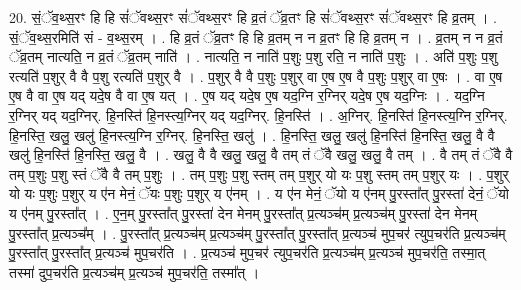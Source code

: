 \documentclass[17pt]{extarticle}
\begin{document}
20. सं॒ॅव॒थ्स॒रꣳ हि हि सं॑ॅवथ्स॒रꣳ सं॑ॅवथ्स॒रꣳ हि व्र॒तं ॅव्र॒तꣳ हि सं॑ॅवथ्स॒रꣳ सं॑ॅवथ्स॒रꣳ हि व्र॒तम् । . सं॒ॅव॒थ्स॒रमिति॑ सं - व॒थ्स॒रम् । . हि व्र॒तं ॅव्र॒तꣳ हि हि व्र॒तम् न न व्र॒तꣳ हि हि व्र॒तम् न । . व्र॒तम् न न व्र॒तं ॅव्र॒तम् नात्यति॒ न व्र॒तं ॅव्र॒तम् नाति॑ । . नात्यति॒ न नाति॑ प॒शुः प॒शु रति॒ न नाति॑ प॒शुः । . अति॑ प॒शुः प॒शु रत्यति॑ प॒शुर् वै वै प॒शु रत्यति॑ प॒शुर् वै । . प॒शुर् वै वै प॒शुः प॒शुर् वा ए॒ष ए॒ष वै प॒शुः प॒शुर् वा ए॒षः । . वा ए॒ष ए॒ष वै वा ए॒ष यद् यदे॒ष वै वा ए॒ष यत् । . ए॒ष यद् यदे॒ष ए॒ष यद॒ग्नि र॒ग्निर् यदे॒ष ए॒ष यद॒ग्निः । . यद॒ग्नि र॒ग्निर् यद् यद॒ग्निर्. हि॒नस्ति॑ हि॒नस्त्य॒ग्निर् यद् यद॒ग्निर्. हि॒नस्ति॑ । . अ॒ग्निर्. हि॒नस्ति॑ हि॒नस्त्य॒ग्नि र॒ग्निर्. हि॒नस्ति॒ खलु॒ खलु॑ हि॒नस्त्य॒ग्नि र॒ग्निर्. हि॒नस्ति॒ खलु॑ । . हि॒नस्ति॒ खलु॒ खलु॑ हि॒नस्ति॑ हि॒नस्ति॒ खलु॒ वै वै खलु॑ हि॒नस्ति॑ हि॒नस्ति॒ खलु॒ वै । . खलु॒ वै वै खलु॒ खलु॒ वै तम् तं ॅवै खलु॒ खलु॒ वै तम् । . वै तम् तं ॅवै वै तम् प॒शुः प॒शु स्तं ॅवै वै तम् प॒शुः । . तम् प॒शुः प॒शु स्तम् तम् प॒शुर् यो यः प॒शु स्तम् तम् प॒शुर् यः । . प॒शुर् यो यः प॒शुः प॒शुर् य ए॑न मेनं॒ ॅयः प॒शुः प॒शुर् य ए॑नम् । . य ए॑न मेनं॒ ॅयो य ए॑नम् पु॒रस्ता᳚त् पु॒रस्ता॑ देनं॒ ॅयो य ए॑नम् पु॒रस्ता᳚त् । . ए॒न॒म् पु॒रस्ता᳚त् पु॒रस्ता॑ देन मेनम् पु॒रस्ता᳚त् प्र॒त्यञ्च॑म् प्र॒त्यञ्च॑म् पु॒रस्ता॑ देन मेनम् पु॒रस्ता᳚त् प्र॒त्यञ्च᳚म् । . पु॒रस्ता᳚त् प्र॒त्यञ्च॑म् प्र॒त्यञ्च॑म् पु॒रस्ता᳚त् पु॒रस्ता᳚त् प्र॒त्यञ्च॑ मुप॒चर॑ त्युप॒चर॑ति प्र॒त्यञ्च॑म् पु॒रस्ता᳚त् पु॒रस्ता᳚त् प्र॒त्यञ्च॑ मुप॒चर॑ति । . प्र॒त्यञ्च॑ मुप॒चर॑ त्युप॒चर॑ति प्र॒त्यञ्च॑म् प्र॒त्यञ्च॑ मुप॒चर॑ति॒ तस्मा॒त् तस्मा॑ दुप॒चर॑ति प्र॒त्यञ्च॑म् प्र॒त्यञ्च॑ मुप॒चर॑ति॒ तस्मा᳚त् । \newline
\end{document}
